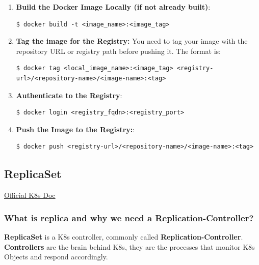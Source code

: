 \documentclass{article}
\newenvironment{codetemplate}[1][]{%
  \mybasecolorbox[#1]
  \itshape
}{%
  \endmybasecolorbox
}
\begin{document}
\begin{enumerate}
    \item \textbf{Build the Docker Image Locally (if not already built)}:
\begin{codetemplate}{}
\begin{verbatim}
$ docker build -t <image_name>:<image_tag>
\end{verbatim}
\end{codetemplate}

    \item \textbf{Tag the image for the Registry:}  You need to tag your image with the repository URL or registry path before pushing it. The format is:
\begin{codetemplate}{}
\begin{verbatim}
$ docker tag <local_image_name>:<image_tag> <registry-url>/<repository-name>/<image-name>:<tag>
\end{verbatim}
\end{codetemplate}

    \item \textbf{Authenticate to the Registry}:
\begin{codetemplate}{}
\begin{verbatim}
$ docker login <registry_fqdn>:<registry_port>
\end{verbatim}
\end{codetemplate}

    \item \textbf{Push the Image to the Registry:}:
\begin{codetemplate}{}
\begin{verbatim}
$ docker push <registry-url>/<repository-name>/<image-name>:<tag>
\end{verbatim}
\end{codetemplate}
\end{enumerate}

\subsection{ReplicaSet}
\href{https://kubernetes.io/docs/concepts/workloads/controllers/replicaset/}{Official K8s Doc}

\subsubsection{What is replica and why we need a Replication-Controller?}

\textbf{ReplicaSet} is a K8s controller, commonly called \textbf{Replication-Controller}. \textbf{Controllers} are the brain behind K8s, they are the processes that monitor K8s Objects and respond accordingly.
\end{document}
